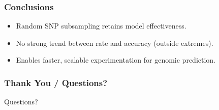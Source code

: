 \documentclass[aspectratio=169]{beamer}
\begin{document}
\begin{frame}
\frametitle{Conclusions}
\begin{itemize}
  \item Random SNP subsampling retains model effectiveness.
  \item No strong trend between rate and accuracy (outside extremes).
  \item Enables faster, scalable experimentation for genomic prediction.
\end{itemize}
\end{frame}

\begin{frame}
\frametitle{Thank You / Questions?}
\centering
\Huge Questions?
\end{frame}
\end{document}

